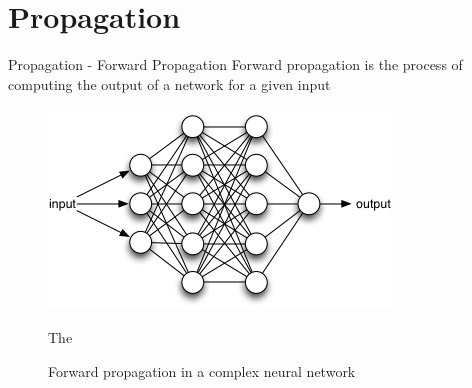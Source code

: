 \documentclass[12pt]{beamer}
\begin{document}
\section{Propagation}
\begin{frame}{Propagation - Forward Propagation}
Forward propagation is  the process of computing the output of a network for a given input
 \begin{figure}
\centering
\includegraphics[width = 0.4\linewidth]{images/forwardpropagation.png}
\caption{Forward propagation in a complex neural network}

The 
\label{fig:principle}
\end{figure}
\end{frame}
\end{document}
